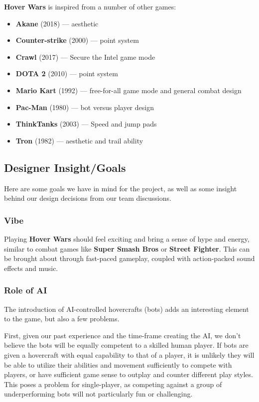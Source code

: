 \documentclass{article}
\newcommand{\namenobold}{Hover Wars}
\newcommand{\name}{\textbf{\namenobold}}
\theoremstyle{definition}
\begin{document}
\name{} is inspired from a number of other games:
\begin{itemize}
  \item \textbf{Akane} (2018) --- aesthetic
  \item \textbf{Counter-strike} (2000) --- point system
  \item \textbf{Crawl} (2017) --- Secure the Intel game mode
  \item \textbf{DOTA 2} (2010) --- point system
  \item \textbf{Mario Kart} (1992) --- free-for-all game mode and general combat design
  \item \textbf{Pac-Man} (1980) --- bot versus player design
  \item \textbf{ThinkTanks} (2003) --- Speed and jump pads
  \item \textbf{Tron} (1982) --- aesthetic and trail ability
\end{itemize}

\subsection{Designer Insight/Goals}

Here are some goals we have in mind for the project, as well as some insight
behind our design decisions from our team discussions.

\subsubsection{Vibe}

Playing \name{} should feel exciting and bring a sense of hype and energy,
similar to combat games like \textbf{Super Smash Bros} or \textbf{Street
Fighter}. This can be brought about through fast-paced gameplay, coupled with
action-packed sound effects and music.

\subsubsection{Role of AI}

The introduction of AI-controlled hovercrafts (bots) adds an interesting
element to the game, but also a few problems.

First, given our past experience and the time-frame creating the AI, we don't
believe the bots will be equally competent to a skilled human player. If bots
are given a hovercraft with equal capability to that of a player, it is
unlikely they will be able to utilize their abilities and movement sufficiently
to compete with players, or have sufficient game sense to outplay and counter
different play styles. This poses a problem for single-player, as competing
against a group of underperforming bots will not particularly fun or
challenging.
\end{document}
